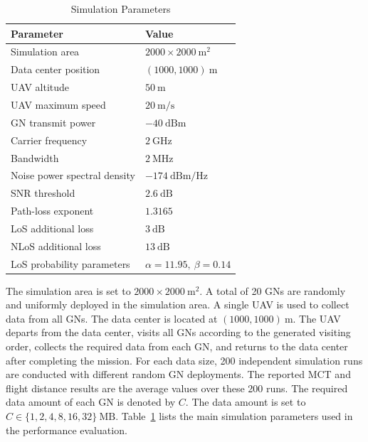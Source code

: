 \documentclass[12pt]{ksthesis}
\begin{document}
\begin{thesis}
{    \begin{table}[!t]
        \centering
        \caption{Simulation Parameters}
        \label{tab:simulation-parameters}
        \begin{tabular}{ll}
            \toprule
            \textbf{Parameter} & \textbf{Value} \\
            \midrule
            Simulation area & \(2000 \times 2000~\mathrm{m}^2\) \\
            Data center position & \((1000,1000)~\mathrm{m}\) \\
            UAV altitude & \(50~\mathrm{m}\) \\
            UAV maximum speed & \(20~\mathrm{m/s}\) \\
            GN transmit power & \(-40~\mathrm{dBm}\) \\
            Carrier frequency & \(2~\mathrm{GHz}\) \\
            Bandwidth & \(2~\mathrm{MHz}\) \\
            Noise power spectral density & \(-174~\mathrm{dBm/Hz}\) \\
            SNR threshold & \(2.6~\mathrm{dB}\) \\
            Path-loss exponent & \(1.3165\) \\
            LoS additional loss & \(3~\mathrm{dB}\) \\
            NLoS additional loss & \(13~\mathrm{dB}\) \\
            LoS probability parameters & \(\alpha=11.95,\ \beta=0.14\) \\
            \bottomrule
        \end{tabular}
    \end{table}

    The simulation area is set to \(2000 \times 2000~\mathrm{m}^2\). A total of 20 GNs are randomly and uniformly deployed in the simulation area. A single UAV is used to collect data from all GNs. The data center is located at \((1000,1000)~\mathrm{m}\). The UAV departs from the data center, visits all GNs according to the generated visiting order, collects the required data from each GN, and returns to the data center after completing the mission. For each data size, 200 independent simulation runs are conducted with different random GN deployments. The reported MCT and flight distance results are the average values over these 200 runs. The required data amount of each GN is denoted by \(C\). The data amount is set to \(C\in\{1,2,4,8,16,32\}~\mathrm{MB}\). Table~\ref{tab:simulation-parameters} lists the main simulation parameters used in the performance evaluation.


}
\end{thesis}
\end{document}
